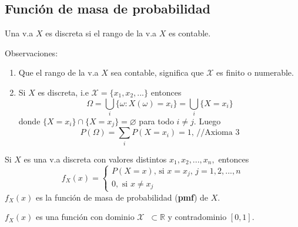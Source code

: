 \subsection{Función de masa de probabilidad}

\begin{definition}[v.a discreta]
Una v.a $X$ es discreta si el rango de la v.a $X$ es contable.
\end{definition}


Observaciones:
\begin{enumerate}

\item Que el rango de la v.a $X$ sea contable, significa que $\mathcal{X}$ es finito o numerable.

\item Si $X$ es discreta, i.e $\mathcal{X}=\{x_{1},x_{2},...\}$ entonces 
\begin{equation*}
\Omega =\bigcup\limits_{i}\{\omega :X(\omega
)=x_{i}\}=\bigcup\limits_{i}\{X=x_{i}\}
\end{equation*}%
donde $\{X=x_{i}\}\cap \{X=x_{j}\}=\varnothing $ para todo $i\neq j.$ 
Luego 
\begin{equation*}
P(\Omega )=\sum\limits_{i}P(X=x_{i})=1\text{, \ //Axioma 3}
\end{equation*}
\end{enumerate}

\begin{definition}[pmf]
Si $X$ es una v.a discreta con valores distintos $x_{1},x_{2},...,x_{n},$ entonces
\begin{equation*}
f_{X}(x)=\left\{ 
\begin{array}{l}
P(X=x)\text{, si }x=x_{j}\text{, \ }j=1,2,...,n \\ 
0,\text{ si }x\neq x_{j}
\end{array}
\right.
\end{equation*}
$f_{X}(x)$ es la función de masa de probabilidad (\textbf{pmf}) de $X$.
\end{definition}
 
\begin{remark}
$f_{X}(x)$ es una función con dominio $\mathcal{X}$ $\ \subset \mathbb{R}$ y contradominio $[0,1].$    
\end{remark}

